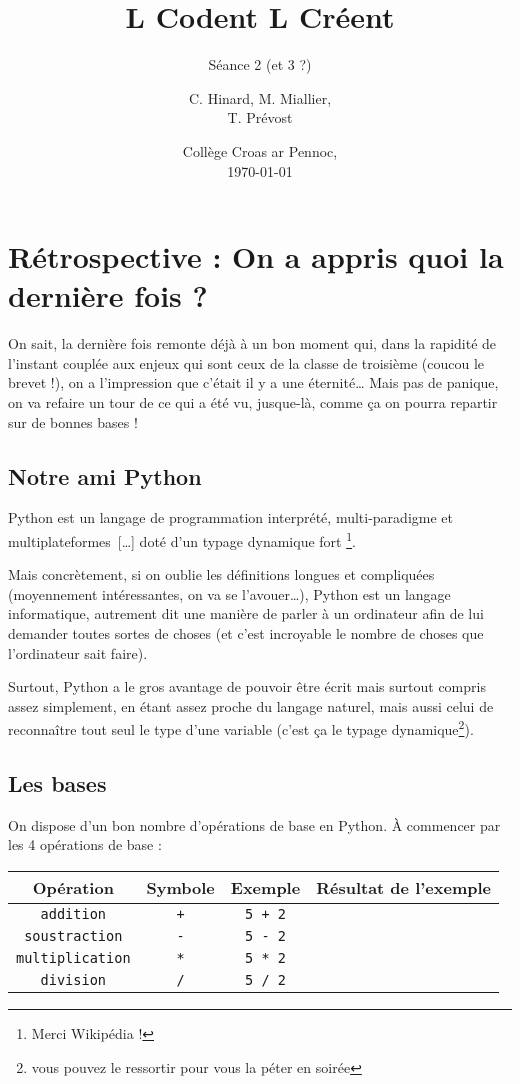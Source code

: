 \documentclass[12pt,a4paper, oneside]{article}
\title[LCLC -- Séance 2 (et 3 ?)]{\og L Codent L Créent \fg{}}
\subtitle{Séance 2 (et 3 ?)}
\author{C. Hinard, M. Miallier, \\T. Prévost}
\date{Collège Croas ar Pennoc,\\ \today}
\begin{document}
\maketitle

  \section{Rétrospective : On a appris quoi la dernière fois ?}\label{sec:rétrospective-:-on-a-appris-quoi-la-dernière-fois-?}
   On sait, la dernière fois remonte déjà à un bon moment qui, dans la rapidité de l'instant couplée aux enjeux qui sont ceux de la classe de troisième (coucou le brevet !), on a l'impression que c'était il y a une éternité\dots
  Mais pas de panique, on va refaire un tour de ce qui a été vu, jusque-là, comme ça on pourra repartir sur de bonnes bases !

   \subsection{Notre ami Python}\label{subsec:notre-ami-python}
      Python est \og un langage de programmation interprété, multi-paradigme et multiplateformes~[\dots] doté d'un typage dynamique fort \fg{}\footnote{Merci Wikipédia !}.

      Mais concrètement, si on oublie les définitions longues et compliquées (moyennement intéressantes, on va se l'avouer\dots), Python est un langage informatique, autrement dit une manière de parler à un ordinateur afin de lui demander toutes sortes de choses (et c'est incroyable le nombre de choses que l'ordinateur sait faire).

       Surtout, Python a le gros avantage de pouvoir être écrit mais surtout compris assez simplement, en étant assez proche du langage naturel, mais aussi celui de reconnaître tout seul le type d'une variable (c'est ça le typage dynamique\footnote{vous pouvez le ressortir pour vous la péter en soirée}).

   \subsection{Les bases}\label{subsec:les-bases}
      On dispose d'un bon nombre d'opérations de base en Python.
      À commencer par les 4 opérations de base :
      \begin{center}
         \begin{tabular}{|c|c|c|c|}
           \hline
           \textbf{Opération} & \textbf{Symbole} & \textbf{Exemple} & \textbf{Résultat de l'exemple} \\
           \hline
            \texttt{addition} & \texttt{+} & \texttt{5 + 2} &  \\
           \hline
            \texttt{soustraction} & \texttt{-} & \texttt{5 - 2} & \\
           \hline
            \texttt{multiplication} & \texttt{*} & \texttt{5 * 2} & \\
           \hline
            \texttt{division} & \texttt{/} & \texttt{5 / 2} & \\
           \hline
         \end{tabular}
      \end{center}
\end{document}

